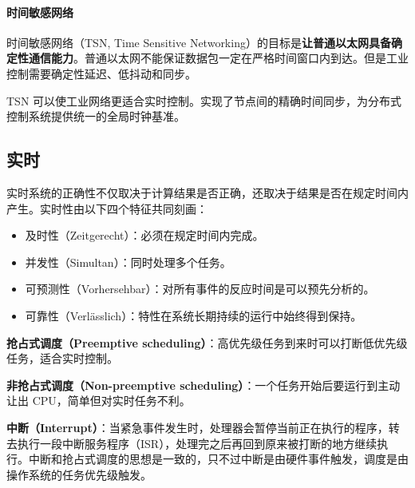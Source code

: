 \paragraph{时间敏感网络}

时间敏感网络（TSN, Time Sensitive Networking）的目标是\textbf{让普通以太网具备确定性通信能力}。普通以太网不能保证数据包一定在严格时间窗口内到达。但是工业控制需要确定性延迟、低抖动和同步。

TSN 可以使工业网络更适合实时控制。实现了节点间的精确时间同步，为分布式控制系统提供统一的全局时钟基准。

\subsection{实时}

实时系统的正确性不仅取决于计算结果是否正确，还取决于结果是否在规定时间内产生。实时性由以下四个特征共同刻画：
\begin{itemize}
    \item 及时性（Zeitgerecht）：必须在规定时间内完成。
    \item 并发性（Simultan）：同时处理多个任务。
    \item 可预测性（Vorhersehbar）：对所有事件的反应时间是可以预先分析的。
    \item 可靠性（Verlässlich）：特性在系统长期持续的运行中始终得到保持。
\end{itemize}

\textbf{抢占式调度（Preemptive scheduling）}：高优先级任务到来时可以打断低优先级任务，适合实时控制。

\textbf{非抢占式调度（Non-preemptive scheduling）}：一个任务开始后要运行到主动让出 CPU，简单但对实时任务不利。

\textbf{中断（Interrupt）}：当紧急事件发生时，处理器会暂停当前正在执行的程序，转去执行一段中断服务程序（ISR），处理完之后再回到原来被打断的地方继续执行。中断和抢占式调度的思想是一致的，只不过中断是由硬件事件触发，调度是由操作系统的任务优先级触发。

